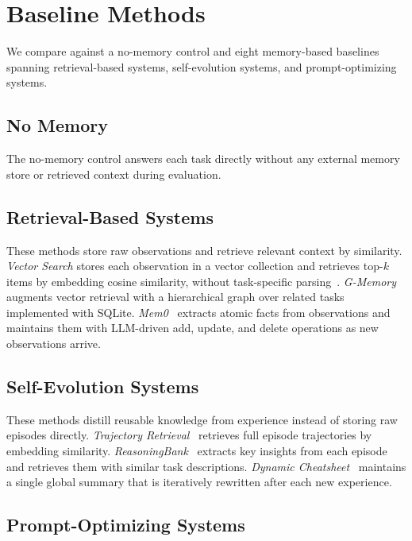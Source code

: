 \FloatBarrier

\section{Baseline Methods}
\label{app:baselines}

We compare \sysname{} against a no-memory control and eight memory-based baselines spanning retrieval-based systems, self-evolution systems, and prompt-optimizing systems.

\subsection{No Memory}
\label{app:baseline-no-memory}

The no-memory control answers each task directly without any external memory store or retrieved context during evaluation.

\subsection{Retrieval-Based Systems}
\label{app:baseline-retrieval}

These methods store raw observations and retrieve relevant context by similarity.
\textit{Vector Search} stores each observation in a vector collection and retrieves top-$k$ items by embedding cosine similarity, without task-specific parsing~\citep{rag}.
\textit{G-Memory}~\citep{alma} augments vector retrieval with a hierarchical graph over related tasks implemented with SQLite.
\textit{Mem0}~\citep{mem0} extracts atomic facts from observations and maintains them with LLM-driven add, update, and delete operations as new observations arrive.

\subsection{Self-Evolution Systems}
\label{app:baseline-self-evolution}

These methods distill reusable knowledge from experience instead of storing raw episodes directly.
\textit{Trajectory Retrieval}~\citep{alma} retrieves full episode trajectories by embedding similarity.
\textit{ReasoningBank}~\citep{ouyang2025reasoningbank} extracts key insights from each episode and retrieves them with similar task descriptions.
\textit{Dynamic Cheatsheet}~\citep{alma} maintains a single global summary that is iteratively rewritten after each new experience.

\subsection{Prompt-Optimizing Systems}
\label{app:baseline-prompt}

